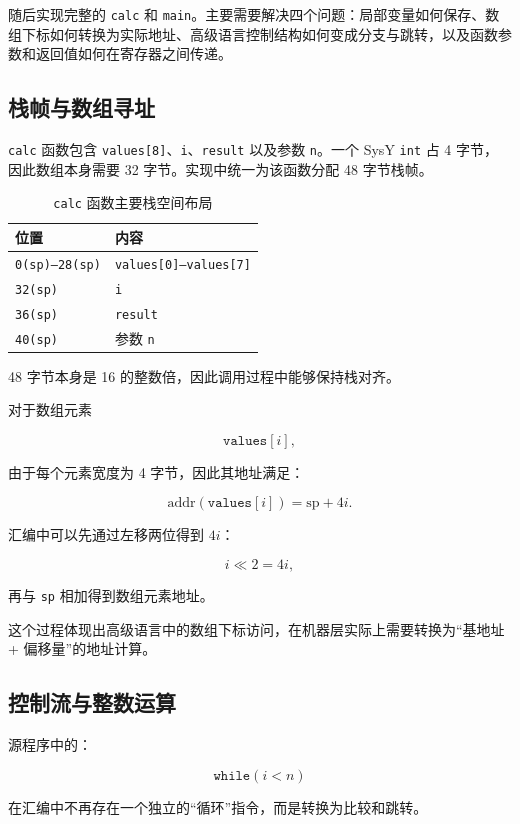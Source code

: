 \documentclass[12pt,a4paper]{ctexart}
\begin{document}
随后实现完整的 \texttt{calc} 和 \texttt{main}。主要需要解决四个问题：局部变量如何保存、数组下标如何转换为实际地址、高级语言控制结构如何变成分支与跳转，以及函数参数和返回值如何在寄存器之间传递。

\subsection{栈帧与数组寻址}

\texttt{calc} 函数包含 \texttt{values[8]}、\texttt{i}、\texttt{result} 以及参数 \texttt{n}。一个 SysY \texttt{int} 占 4 字节，因此数组本身需要 32 字节。实现中统一为该函数分配 48 字节栈帧。

\begin{table}[H]
\centering
\caption{\texttt{calc} 函数主要栈空间布局}
\begin{tabular}{ll}
\toprule
位置 & 内容 \\
\midrule
\texttt{0(sp)--28(sp)} & \texttt{values[0]--values[7]} \\
\texttt{32(sp)} & \texttt{i} \\
\texttt{36(sp)} & \texttt{result} \\
\texttt{40(sp)} & 参数 \texttt{n} \\
\bottomrule
\end{tabular}
\end{table}

48 字节本身是 16 的整数倍，因此调用过程中能够保持栈对齐。

对于数组元素

\[
\texttt{values}[i],
\]

由于每个元素宽度为 4 字节，因此其地址满足：

\[
\mathrm{addr}(\texttt{values}[i])
=
\mathrm{sp}+4i.
\]

汇编中可以先通过左移两位得到 $4i$：

\[
i \ll 2 = 4i,
\]

再与 \texttt{sp} 相加得到数组元素地址。

这个过程体现出高级语言中的数组下标访问，在机器层实际上需要转换为“基地址 + 偏移量”的地址计算。

\subsection{控制流与整数运算}

源程序中的：

\[
\texttt{while}(i<n)
\]

在汇编中不再存在一个独立的“循环”指令，而是转换为比较和跳转。
\end{document}
